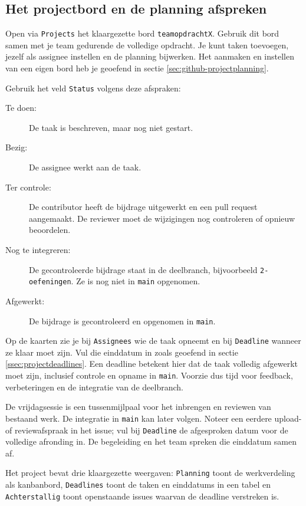 \documentclass[kulak]{kulakarticle} %
\begin{document}
\subsection{Het projectbord en de planning afspreken}
\label{ssec:teamplanning}

Open via \texttt{Projects} het klaargezette bord \texttt{teamopdrachtX}.
Gebruik dit bord samen met je team gedurende de volledige opdracht.
Je kunt taken toevoegen, jezelf als assignee instellen en de planning
bijwerken. Het aanmaken en instellen van een eigen bord heb je geoefend
in sectie \ref{sec:github-projectplanning}.

Gebruik het veld \texttt{Status} volgens deze afspraken:
\begin{description}
    \item[Te doen:] De taak is beschreven, maar nog niet gestart.
    \item[Bezig:] De assignee werkt aan de taak.
    \item[Ter controle:] De contributor heeft de bijdrage uitgewerkt en
    een pull request aangemaakt. De reviewer moet de wijzigingen nog
    controleren of opnieuw beoordelen.
    \item[Nog te integreren:] De gecontroleerde bijdrage staat in de
    deelbranch, bijvoorbeeld \texttt{2-oefeningen}. Ze is nog niet in
    \texttt{main} opgenomen.
    \item[Afgewerkt:] De bijdrage is gecontroleerd en opgenomen in
    \texttt{main}.
\end{description}

Op de kaarten zie je bij \texttt{Assignees} wie de taak opneemt en bij
\texttt{Deadline} wanneer ze klaar moet zijn. Vul die einddatum in zoals
geoefend in sectie \ref{ssec:projectdeadlines}.
Een deadline betekent hier dat de taak volledig afgewerkt moet zijn,
inclusief controle en opname in \texttt{main}. Voorzie dus tijd voor
feedback, verbeteringen en de integratie van de deelbranch.

De vrijdagsessie is een tussenmijlpaal voor het inbrengen en reviewen van
bestaand werk. De integratie in \texttt{main} kan later volgen. Noteer een
eerdere upload- of reviewafspraak in het issue; vul bij \texttt{Deadline}
de afgesproken datum voor de volledige afronding in. De begeleiding en
het team spreken die einddatum samen af.

Het project bevat drie klaargezette weergaven: \texttt{Planning} toont de
werkverdeling als kanbanbord, \texttt{Deadlines} toont de taken en einddatums
in een tabel en \texttt{Achterstallig} toont openstaande issues waarvan de
deadline verstreken is.
\end{document}
